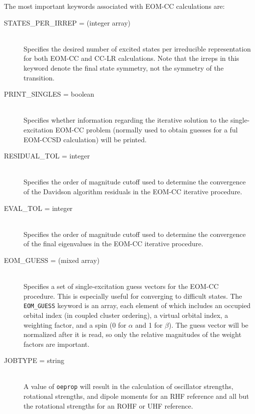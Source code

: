 The most important keywords associated with EOM-CC calculations are:
\begin{description}
\item[STATES\_PER\_IRREP = (integer array)]\mbox{}\\
Specifies the desired number of excited states per irreducible representation 
for both EOM-CC and CC-LR calculations.  Note that the irreps in this
keyword denote the final state symmetry, not the symmetry of the transition.  
\item[PRINT\_SINGLES = boolean]\mbox{}\\
Specifies whether information regarding the iterative solution to the
single-excitation EOM-CC problem (normally used to obtain guesses for a
ful EOM-CCSD calculation) will be printed.
\item[RESIDUAL\_TOL = integer]\mbox{}\\
Specifies the order of magnitude cutoff used to determine the convergence of 
the Davidson algorithm residuals in the EOM-CC iterative procedure.
\item[EVAL\_TOL = integer]\mbox{}\\
Specifies the order of magnitude cutoff used to determine the convergence
of the final eigenvalues in the EOM-CC iterative procedure.
\item[EOM\_GUESS = (mixed array)]\mbox{}\\ Specifies a set
of single-excitation guess vectors for the EOM-CC procedure.  This is
especially useful for converging to difficult states.  The {\tt EOM\_GUESS}
keyword is an array, each element of which includes an occupied orbital
index (in coupled cluster ordering), a virtual orbital index, a weighting
factor, and a spin (0 for $\alpha$ and 1 for $\beta$).  The guess vector
will be normalized after it is read, so only the relative magnitudes of the
weight factors are important.
\item[JOBTYPE = string]\mbox{}\\
A value of {\tt oeprop} will result in the calculation of oscillator 
strengths, rotational strengths, and dipole moments for an RHF reference
and all but the rotational strengths for an ROHF or UHF reference.
\end{description}

